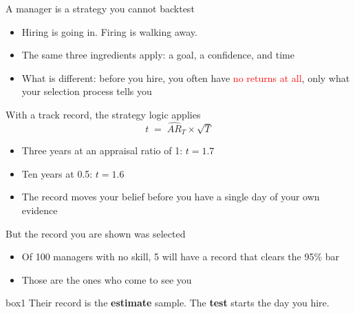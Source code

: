 \documentclass[aspectratio=169,10pt]{beamer}
\begin{document}
\begin{frame}{A manager is a strategy you cannot backtest}
\begin{itemize}
\item Hiring is going in. Firing is walking away.
\vskip 14pt
\item The same three ingredients apply: a goal, a confidence, and time
\vskip 14pt
\item What is different: before you hire, you often have \textcolor{red}{no returns at all}, only what your selection process tells you
\end{itemize}
\end{frame}

\begin{frame}{With a track record, the strategy logic applies}
\[ t \;=\; \widehat{AR}_T \times \sqrt{T} \]
\vskip 4pt
\begin{itemize}
\item Three years at an appraisal ratio of 1: $t = 1.7$
\vskip 10pt
\item Ten years at 0.5: $t = 1.6$
\vskip 10pt
\item The record moves your belief before you have a single day of your own evidence
\end{itemize}
\end{frame}

\begin{frame}{But the record you are shown was selected}
\begin{itemize}
\item Of 100 managers with no skill, 5 will have a record that clears the 95\% bar
\vskip 12pt
\item Those are the ones who come to see you
\end{itemize}
\vskip 16pt
\begin{beamercolorbox}[rounded=true,sep=8pt,center]{box1}
Their record is the \textbf{estimate} sample. The \textbf{test} starts the day you hire.
\end{beamercolorbox}
\end{frame}
\end{document}
